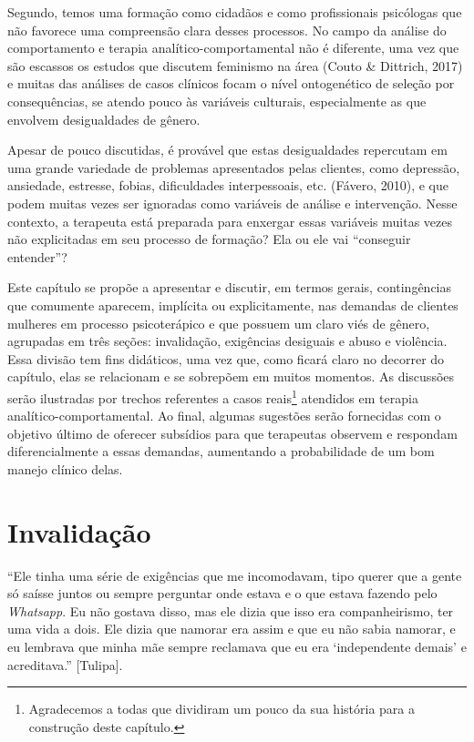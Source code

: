 Segundo, temos uma formação como cidadãos e como profissionais psicólogas que não favorece uma compreensão clara desses processos. No campo da análise do comportamento e terapia analítico-comportamental não é diferente, uma vez que são escassos os estudos que discutem feminismo na área (Couto \& Dittrich, 2017) e muitas das análises de casos clínicos focam o nível ontogenético de seleção por consequências, se atendo pouco às variáveis culturais, especialmente as que envolvem desigualdades de gênero.

Apesar de pouco discutidas, é provável que estas desigualdades repercutam em uma grande variedade de problemas apresentados pelas clientes, como depressão, ansiedade, estresse, fobias, dificuldades interpessoais, etc. (Fávero, 2010), e que podem muitas vezes ser ignoradas como variáveis de análise e intervenção. Nesse contexto, a terapeuta está preparada para enxergar essas variáveis muitas vezes não explicitadas em seu processo de formação? Ela ou ele vai ``conseguir entender''?

Este capítulo se propõe a apresentar e discutir, em termos gerais, contingências que comumente aparecem, implícita ou explicitamente, nas demandas de clientes mulheres em processo psicoterápico e que possuem um claro viés de gênero, agrupadas em três seções: invalidação, exigências desiguais e abuso e violência. Essa divisão tem fins didáticos, uma vez que, como ficará claro no decorrer do capítulo, elas se relacionam e se sobrepõem em muitos momentos. As discussões serão ilustradas por trechos referentes a casos reais\footnote{Agradecemos a todas que dividiram um pouco da sua história para a construção deste capítulo.} atendidos em terapia analítico-comportamental. Ao final, algumas sugestões serão fornecidas com o objetivo último de oferecer subsídios para que terapeutas observem e respondam diferencialmente a essas demandas, aumentando a probabilidade de um bom manejo clínico delas. 

\section{Invalidação}

``Ele tinha uma série de exigências que me incomodavam, tipo querer que a gente só saísse juntos ou sempre perguntar onde estava e o que estava fazendo pelo \textit{Whatsapp}. Eu não gostava disso, mas ele dizia que isso era companheirismo, ter uma vida a dois. Ele dizia que namorar era assim e que eu não sabia namorar, e eu lembrava que minha mãe sempre reclamava que eu era ‘independente demais’ e acreditava.'' [Tulipa].

